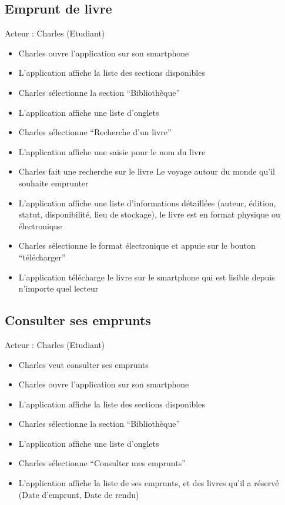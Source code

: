 \subsection*{Emprunt de livre}
Acteur : Charles (Etudiant)
\begin{itemize}
\item Charles ouvre l’application sur son smartphone 
\item L’application affiche la liste des sections disponibles 
\item Charles sélectionne la section “Bibliothèque” 
\item L’application affiche une liste d’onglets 
\item Charles sélectionne “Recherche d’un livre” 
\item L’application affiche une saisie pour le nom du livre 
\item Charles fait une recherche sur le livre Le voyage autour du monde qu’il souhaite emprunter 
\item L’application affiche une liste d’informations détaillées (auteur, édition, statut, disponibilité, lieu de stockage), le livre est en format physique ou électronique 
\item Charles sélectionne le format électronique et appuie sur le bouton “télécharger” 
\item L’application télécharge le livre sur le smartphone qui est lisible depuis n’importe quel lecteur
\end{itemize}

\subsection*{Consulter ses emprunts}
Acteur : Charles (Etudiant)
\begin{itemize}
\item Charles veut consulter ses emprunts 
\item Charles ouvre l’application sur son smartphone 
\item L’application affiche la liste des sections disponibles 
\item Charles sélectionne la section “Bibliothèque” 
\item L’application affiche une liste d’onglets 
\item Charles sélectionne “Consulter mes emprunts” 
\item L’application affiche la liste de ses emprunts, et des livres qu’il a réservé (Date d’emprunt, Date de rendu) 
\end{itemize}

